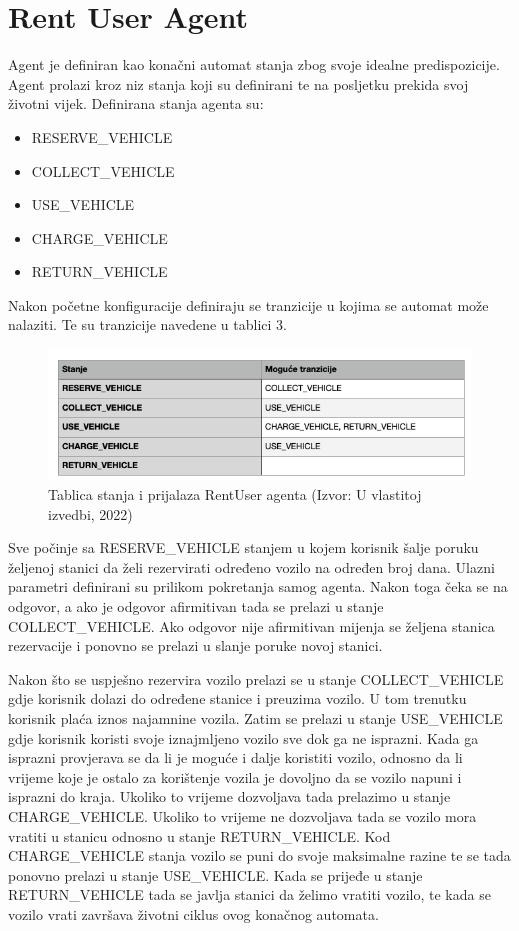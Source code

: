 \documentclass{foi}
\begin{document}
\pagebreak

\section{Rent User Agent}

Agent je definiran kao konačni automat stanja zbog svoje idealne predispozicije. Agent prolazi kroz niz stanja koji su definirani te na posljetku prekida svoj životni vijek. Definirana stanja agenta su:
\begin{itemize}
	\item RESERVE\_VEHICLE
	\item COLLECT\_VEHICLE
	\item USE\_VEHICLE
	\item CHARGE\_VEHICLE
	\item RETURN\_VEHICLE
\end{itemize}

Nakon početne konfiguracije definiraju se tranzicije u kojima se automat može nalaziti. Te su tranzicije navedene u tablici 3.

\begin{figure}[h!]
	\centering
	\includegraphics[width=1\textwidth]{slike/tablica3.png}
	\caption{Tablica stanja i prijalaza RentUser agenta (Izvor: U vlastitoj izvedbi, 2022)}
\end{figure}

Sve počinje sa RESERVE\_VEHICLE stanjem u kojem korisnik šalje poruku željenoj stanici da želi rezervirati određeno vozilo na određen broj dana. Ulazni parametri definirani su prilikom pokretanja samog agenta. Nakon toga čeka se na odgovor, a ako je odgovor afirmitivan tada se prelazi u stanje COLLECT\_VEHICLE. Ako odgovor nije afirmitivan mijenja se željena stanica rezervacije i ponovno se prelazi u slanje poruke novoj stanici. 

Nakon što se uspješno rezervira vozilo prelazi se u stanje COLLECT\_VEHICLE gdje korisnik dolazi do određene stanice i preuzima vozilo. U tom trenutku korisnik plaća iznos najamnine vozila. Zatim se prelazi u stanje USE\_VEHICLE gdje korisnik koristi svoje iznajmljeno vozilo sve dok ga ne isprazni. Kada ga isprazni provjerava se da li je moguće i dalje koristiti vozilo, odnosno da li vrijeme koje je ostalo za korištenje vozila je dovoljno da se vozilo napuni i isprazni do kraja. Ukoliko to vrijeme dozvoljava tada prelazimo u stanje CHARGE\_VEHICLE. Ukoliko to vrijeme ne dozvoljava tada se vozilo mora vratiti u stanicu odnosno u stanje RETURN\_VEHICLE. Kod CHARGE\_VEHICLE stanja vozilo se puni do svoje maksimalne razine te se tada ponovno prelazi u stanje USE\_VEHICLE. Kada se prijeđe u stanje RETURN\_VEHICLE tada se javlja stanici da želimo vratiti vozilo, te kada se vozilo vrati završava životni ciklus ovog konačnog automata.
\end{document}
